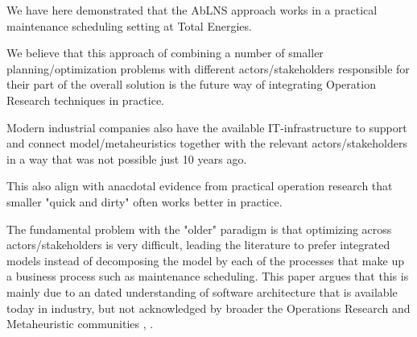 We have here demonstrated that the AbLNS approach works in a practical 
maintenance scheduling setting at Total Energies.

We believe that this
approach of combining a number of smaller planning/optimization problems with
different actors/stakeholders responsible for their part of the overall
solution is the future way of integrating Operation Research techniques in practice.

Modern industrial companies also have the available IT-infrastructure to support
and connect model/metaheuristics together with the relevant actors/stakeholders 
in a way that was not possible just 10 years ago. 

This also align with anacdotal evidence from practical operation research 
that smaller "quick and dirty" often works better in practice. 


The fundamental problem with the "older" paradigm is that optimizing across
actors/stakeholders is very difficult, leading the literature to prefer
integrated models instead of decomposing the model by each of the
processes that make up a business process such as maintenance scheduling.
This paper argues that this is mainly due to an dated understanding of
software architecture that is available today in industry, but not
acknowledged by broader the Operations Research and Metaheuristic
communities \citep{talbiMetaheuristicsDesignImplementation2009},
\citep{gendreauHandbookMetaheuristics2019}.
